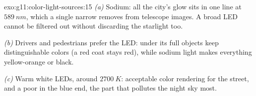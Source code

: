 \begin{solution}{exo:g11:color-light-sources:15}
\emph{(a)} Sodium: all the city's glow sits in one line at
$\qty{589}{nm}$, which a single narrow  removes from telescope
images. A broad LED  cannot be filtered out without discarding
the starlight too.

\emph{(b)} Drivers and pedestrians prefer the LED: under its full
 objects keep distinguishable colors (a red coat stays red),
while sodium light makes everything yellow-orange or black.

\emph{(c)} Warm white LEDs, around $\qty{2700}{K}$: acceptable color
rendering for the street, and a  poor in the blue end, the part
that pollutes the night sky most.
\end{solution}

